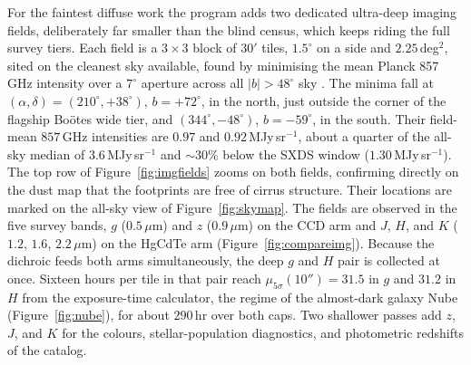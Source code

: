 \documentclass[10pt,onecolumn]{article}
\begin{document}
For the faintest diffuse work the program adds two dedicated ultra-deep imaging fields, deliberately far smaller than the blind census, which keeps riding the full survey tiers. Each field is a $3\times3$ block of $30'$ tiles, $1.5^\circ$ on a side and $2.25$\,deg$^2$, sited on the cleanest sky available, found by minimising the mean Planck 857\,GHz intensity over a $7^\circ$ aperture across all $|b|>48^\circ$ sky \cite{planck2018hfi}. The minima fall at $(\alpha,\delta)=(210^\circ,+38^\circ)$, $b=+72^\circ$, in the north, just outside the corner of the flagship Bo\"otes wide tier, and $(344^\circ,-48^\circ)$, $b=-59^\circ$, in the south. Their field-mean $857$\,GHz intensities are $0.97$ and $0.92$\,MJy\,sr$^{-1}$, about a quarter of the all-sky median of $3.6$\,MJy\,sr$^{-1}$ and $\sim30\%$ below the SXDS window ($1.30$\,MJy\,sr$^{-1}$). The top row of Figure~\ref{fig:imgfields} zooms on both fields, confirming directly on the dust map that the footprints are free of cirrus structure. Their locations are marked on the all-sky view of Figure~\ref{fig:skymap}. The fields are observed in the five survey bands, $g$ ($0.5\,\mu$m) and $z$ ($0.9\,\mu$m) on the CCD arm and $J$, $H$, and $K$ ($1.2$, $1.6$, $2.2\,\mu$m) on the HgCdTe arm (Figure~\ref{fig:compareimg}). Because the dichroic feeds both arms simultaneously, the deep $g$ and $H$ pair is collected at once. Sixteen hours per tile in that pair reach $\mu_{5\sigma}(10'')=31.5$ in $g$ and $31.2$ in $H$ from the exposure-time calculator, the regime of the almost-dark galaxy Nube (Figure~\ref{fig:nube}), for about $290$\,hr over both caps. Two shallower passes add $z$, $J$, and $K$ for the colours, stellar-population diagnostics, and photometric redshifts of the catalog.
\end{document}
